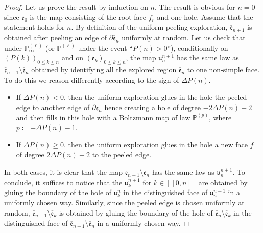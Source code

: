 \documentclass[11pt]{article}
\numberwithin{equation}{section}
\def\P{\mathbb{P}}
\def\lb{[\![}
\def\rb{]\!]}
\begin{document}
\begin{proof}
	Let us prove the result by induction on $n$. The result is obvious for $n=0$ since $\overline{\mathfrak{e}}_0$ is the map consisting of the root face $f_r$ and one hole. Assume that the statement holds for $n$. By definition of the uniform peeling exploration, $\overline{\mathfrak{e}}_{n+1}$ is obtained after peeling an edge of $\partial \overline{\mathfrak{e}}_n$ uniformly at random. Let us check that under $\P^{(\ell)}_\infty$ (or $\P^{(\ell)}$ under the event ``$P(n)>0$''), conditionally on $(P(k))_{0\le k \le n}$ and on $(\overline{\mathfrak{e}}_k)_{0\le k \le n}$, the map $\mathfrak{u}^{n+1}_n$ has the same law as $\overline{\mathfrak{e}}_{n+1} \setminus \overline{\mathfrak{e}}_n$ obtained by identifying all the explored region $\overline{\mathfrak{e}}_n$ to one non-simple face. To do this we reason differently according to the sign of $\Delta P(n)$.
	\begin{itemize}
		\item If $\Delta P(n)<0$, then the uniform exploration glues in the hole the peeled edge to another edge of $\partial \overline{\mathfrak{e}}_n$ hence creating a hole of degree $-2\Delta P(n) -2$ and then fills in this hole with a Boltzmann map of law $\P^{(p)}$, where $p\coloneqq -\Delta P(n) -1$.
		\item  If $\Delta P(n) \ge 0$, then the uniform exploration glues in the hole a new face $f$ of degree $2 \Delta P(n) +2$ to the peeled edge.
	\end{itemize}
	In both cases, it is clear that the map $\overline{\mathfrak{e}}_{n+1} \setminus \overline{\mathfrak{e}}_n$ has the same law as $\mathfrak{u}^{n+1}_n$. To conclude, it suffices to notice that the $\mathfrak{u}^{n+1}_k$ for $k \in \lb 0, n \rb$ are obtained by gluing the boundary of the hole of $\mathfrak{u}^n_k$ in the distinguished face of $\mathfrak{u}^{n+1}_n$ in a uniformly chosen way. Similarly, since the peeled edge is chosen uniformly at random, $\overline{\mathfrak{e}}_{n+1} \setminus \overline{\mathfrak{e}}_k$ is obtained by gluing the boundary of the hole of $ \overline{\mathfrak{e}}_n \setminus \overline{\mathfrak{e}}_k$ in the distinguished face of $\overline{\mathfrak{e}}_{n+1} \setminus \overline{\mathfrak{e}}_n$ in a uniformly chosen way.
\end{proof}
\end{document}
